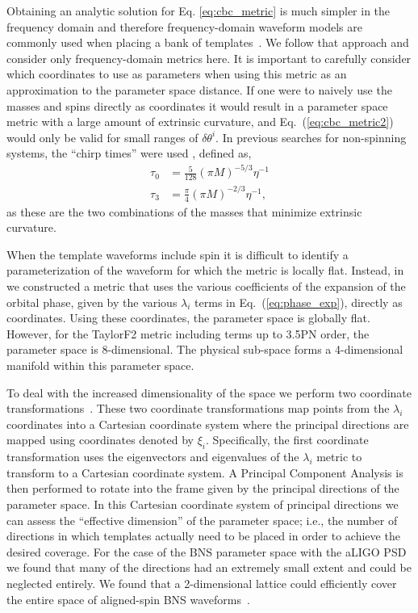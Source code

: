 Obtaining an analytic solution for Eq. \ref{eq:cbc_metric} is much simpler in 
the frequency domain and therefore frequency-domain waveform models are 
commonly used when placing a bank of 
templates~\cite{Owen:1995tm,Owen:1998dk,Babak:2012zx}. We follow that approach 
and consider only frequency-domain metrics here. It is important to carefully 
consider which
coordinates to use as parameters when using this metric as an approximation to
the parameter space distance. If one were to naively use the masses and spins
directly as coordinates it
would result in a parameter space metric with a large amount of extrinsic
curvature, and Eq.~(\ref{eq:cbc_metric2})
would only be valid for small ranges of $\delta\theta^i$. In previous searches
for non-spinning systems,
the ``chirp times'' were used \cite{Owen:1998dk}, defined as,
%
\begin{subequations}
\begin{align}
 \tau_0 &= \frac{5}{128} \left(\pi M \right)^{-5/3} \eta^{-1} \\
 \tau_3 &= \frac{\pi}{4} \left(\pi M \right)^{-2/3} \eta^{-1},
\end{align}
\end{subequations}
%
as these are the two combinations of the masses that minimize extrinsic
curvature.

When the template waveforms include spin it is difficult to identify a
parameterization of the waveform for which the metric is locally flat.
Instead, in~\cite{Brown:2012qf} we constructed a metric
that uses the various coefficients of the expansion of the orbital
phase, given by the various $\lambda_i$ terms in Eq.~(\ref{eq:phase_exp}),
directly as coordinates. Using these coordinates, the parameter space is
globally flat. However, for the TaylorF2 metric including terms up to
3.5\ac{PN} order, the parameter space is 8-dimensional. The physical 
sub-space forms a 4-dimensional manifold within this parameter 
space.

To deal with the increased dimensionality of the space we perform two
coordinate transformations~\cite{Brown:2012qf,Ohme:2013nsa}. These two 
coordinate
transformations map points from the $\lambda_i$ coordinates into a
Cartesian coordinate system where the principal directions are mapped using
coordinates denoted by $\xi_i$. Specifically, the first coordinate 
transformation uses the eigenvectors and
eigenvalues of the $\lambda_i$ metric to transform to a Cartesian
coordinate system. A Principal Component Analysis is then performed to rotate
into the frame given by the principal directions of the parameter space. In 
this Cartesian coordinate system of principal directions we can
assess the ``effective dimension'' of the parameter space; i.e., the number of
directions in which templates actually need to be placed in order to achieve the
desired coverage. For the case of the \ac{BNS} parameter space with the 
\ac{aLIGO} \ac{PSD} we found that many of the directions had an extremely small 
extent and
could be neglected entirely. We found that a 2-dimensional lattice could
efficiently cover the entire space of aligned-spin \ac{BNS}
waveforms~\cite{Brown:2012qf}.


